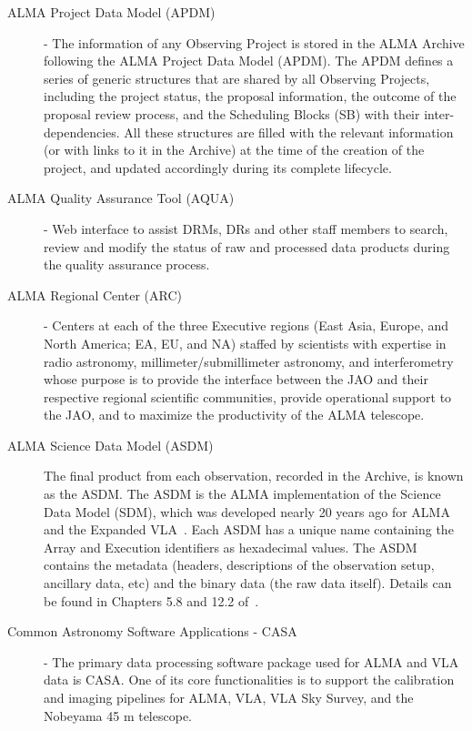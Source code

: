 \begin{description}
\item[ALMA Project Data Model (APDM)] - The information of any Observing Project is stored in the ALMA Archive following the ALMA Project Data Model (APDM). The APDM defines a series of generic structures that are shared by all Observing Projects, including the project status, the proposal information, the outcome of the proposal review process, and the Scheduling Blocks (SB) with their inter-dependencies.
All these structures are filled with the relevant information (or with links to it in the Archive) at the time of the creation of the project, and updated accordingly during its complete lifecycle.
\item[ALMA Quality Assurance Tool (AQUA)] - Web interface to assist DRMs, DRs and other staff members to search, review and modify the status of raw and processed data products during the quality assurance process.
\item[ALMA Regional Center (ARC)] - Centers at each of the three Executive regions (East Asia, Europe, and North America; EA, EU, and NA) staffed by scientists with expertise in radio astronomy, millimeter/submillimeter astronomy, and interferometry whose purpose is to provide the interface between the JAO and their respective regional scientific communities, provide operational support to the JAO, and to maximize the productivity of the ALMA telescope. 
\item[ALMA Science Data Model (ASDM)] The final product from each observation, recorded in the Archive, is known as the ASDM. The ASDM is the ALMA implementation of the Science Data Model (SDM), which was developed nearly 20 years ago for ALMA and the Expanded VLA~\cite{Viallefond2006,Pokorny2009,Lucas2010}. 
Each ASDM has a unique name containing the Array and Execution identifiers as hexadecimal values. The ASDM contains the metadata (headers, descriptions of the observation setup, ancillary data, etc) and the binary data (the raw data itself). Details can be found in Chapters 5.8 and 12.2 of~\cite{c10_thb}.
\item[Common Astronomy Software Applications - CASA] - The primary data processing software package used for ALMA and VLA data is CASA. One of its core functionalities is to support the calibration and imaging pipelines for ALMA, VLA, VLA Sky Survey, and the Nobeyama 45 m telescope.

\end{description}

